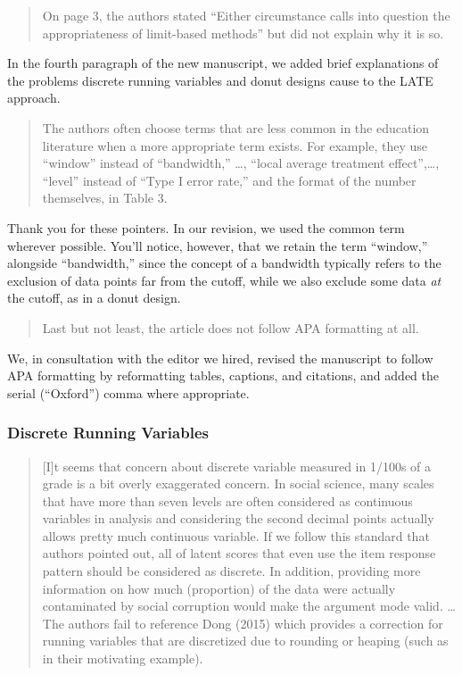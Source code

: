 \documentclass[12pt]{article}
\begin{document}
\begin{quote}
On page 3, the authors stated “Either circumstance calls into question
the appropriateness of limit-based methods” but did not explain why it
is so.
\end{quote}
In the fourth paragraph of the new manuscript, we added brief
explanations of the problems discrete running variables and donut
designs cause to the LATE approach.




\begin{quote}
The authors often choose terms that are less common in the education
literature when a more appropriate term exists. For example, they use
“window” instead of “bandwidth,” \dots, “local average treatment
effect”,\dots, “level” instead of “Type I error
rate,” and the format of the number themselves, in Table 3.
\end{quote}
Thank you for these pointers. In our revision, we used the common term
wherever possible. You'll notice, however, that we retain the term
``window,'' alongside ``bandwidth,'' since the concept of a bandwidth
typically refers to the exclusion of data points far from the cutoff,
while we also exclude some data \emph{at} the cutoff, as in a donut
design.

\begin{quote}
Last but not least, the article does not follow APA formatting at
all.
\end{quote}
We, in consultation with the editor we hired, revised the manuscript
to follow APA formatting by reformatting tables, captions, and
citations, and added the serial (``Oxford'') comma where appropriate.

\subsubsection{Discrete Running Variables}
\begin{quote}
[I]t seems that concern about discrete variable measured in 1/100s of a
grade is a bit overly exaggerated concern. In social science, many
scales that have more than seven levels are often considered as
continuous variables in analysis and considering the second decimal
points actually allows pretty much continuous variable. If we follow
this standard that authors pointed out, all of latent scores that even
use the item response pattern should be considered as discrete. In
addition, providing more information on how much (proportion) of the
data were actually contaminated by social corruption would make the
argument mode valid. \dots The authors fail to reference Dong (2015) which provides a correction
for running variables that are discretized due to rounding or heaping
(such as in their motivating example).
\end{quote}
\end{document}
